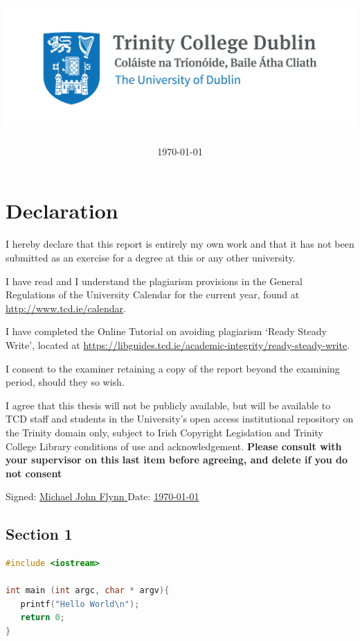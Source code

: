 \documentclass[a4paper,oneside,12pt]{article}
\date{\today}
\author{\authorname}
\title{
    \vspace{5cm}
    \includegraphics[scale=1]{images/Trinity_RGB_transparent_main.png}
    \\
    \textbf{\reportTitle}
}
\begin{document}

\maketitle

\newpage
\section*{\Huge\textcolor{tcd_blue}{Declaration}}
\vspace{1cm}
I hereby declare that this report is entirely my own work and that it has not been submitted as an exercise for a degree at this or any other university.

\vspace{1cm}
I have read and I understand the plagiarism provisions in the General Regulations of the University Calendar for the current year, found at \url{http://www.tcd.ie/calendar}.
\vspace{1cm}

I have completed the Online Tutorial on avoiding plagiarism `Ready Steady Write', located at \url{https://libguides.tcd.ie/academic-integrity/ready-steady-write}.
\vspace{1cm}

I consent to the examiner retaining a copy of the report beyond the examining period, should they so wish.
\vspace{1cm}

I agree that this thesis will not be publicly available, but will be available to TCD staff and students in the University’s open access institutional repository on the Trinity domain only, subject to Irish Copyright Legislation and Trinity College Library conditions of use and acknowledgement.  \textbf{Please consult with your supervisor on this last item before agreeing, and delete if you do not consent}
\vspace{3cm}

Signed: \uline{\hfill Michael John Flynn \hfill} \hfill Date: \uline{ \hfill \today \hfill}


\newpage

\textcolor{tcd_blue}{\section{Section 1}}

\begin{lstlisting}[language=c, caption= this is a code block]
#include <iostream>

int main (int argc, char * argv){
   printf("Hello World\n");
   return 0;
}
\end{lstlisting}
\end{document}
